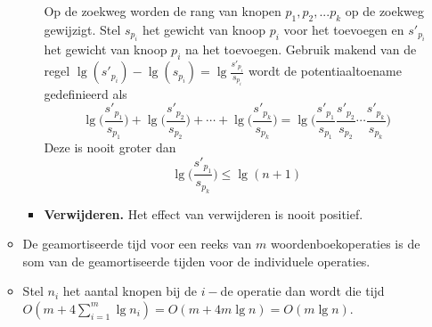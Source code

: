 \begin{itemize}
\begin{itemize}
\begin{itemize}
            Op de zoekweg worden de rang van knopen $p_1,p_2, ... p_k$ op de zoekweg gewijzigt. Stel $s_{p_{i}}$ het gewicht van knoop $p_i$ voor het toevoegen en $s'_{p_{i}}$ het gewicht van knoop $p_i$ na het toevoegen. Gebruik makend van de regel $\lg(s'_{p_{i}}) - \lg(s_{p_{i}}) = \lg\frac{s'_{p_{i}}}{s_{p_{i}}}$ wordt de potentiaaltoename gedefinieerd als
            $$\lg\bigg(\frac{s'_{p_{1}}}{s_{p_{1}}}\bigg) + \lg\bigg(\frac{s'_{p_{2}}}{s_{p_{2}}}\bigg) + \cdots + \lg\bigg(\frac{s'_{p_{k}}}{s_{p_{k}}}\bigg) = \lg\bigg(\frac{s'_{p_{1}}}{s_{p_{1}}}\frac{s'_{p_{2}}}{s_{p_{2}}}\cdots\frac{s'_{p_{k}}}{s_{p_{k}}}\bigg)$$
            Deze is nooit groter dan $$\lg\bigg(\frac{s'_{p_{1}}}{s_{p_{k}}}\bigg) \leq \lg(n + 1)$$
            \item \textbf{Verwijderen.} Het effect van verwijderen is nooit positief.
        \end{itemize}
        \item De geamortiseerde tijd voor een reeks van $m$ woordenboekoperaties is de som van de geamortiseerde tijden voor de individuele operaties.
        \item Stel $n_i$ het aantal knopen bij de $i-$de operatie dan wordt die tijd $O(m + 4\sum_{i=1}^m\lg n_i) = O(m + 4m\lg n) = O(m\lg n)$.
    \end{itemize}
\end{itemize}

